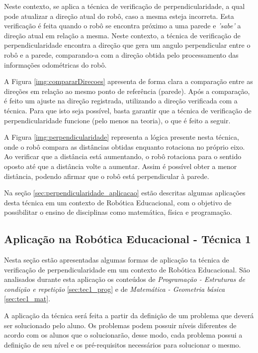 	Neste contexto, se aplica a técnica de verificação de perpendicularidade, a qual pode atualizar a direção atual do robô, caso a mesma esteja incorreta. Esta verificação é feita quando o robô se encontra próximo a uma parede e \textit{'sabe'} a direção atual em relação a mesma. Neste contexto, a técnica de verificação de perpendicularidade encontra a direção que gera um angulo perpendicular entre o robô e a parede, comparando-a com a direção obtida pelo processamento das informações odométricas do robô.

	A Figura \ref{img:compararDirecoes} apresenta de forma clara a comparação entre as direções em relação ao mesmo ponto de referência (parede). Após a comparação, é feito um ajuste na direção registrada, utilizando a direção verificada com a técnica. Para que isto seja possível, basta garantir que a técnica de verificação de perpendicularidade funcione (pelo menos na teoria), o que é feito a seguir.

	A Figura \ref{img:perpendicularidade} representa a lógica presente nesta técnica, onde o robô compara as distâncias obtidas enquanto rotaciona no próprio eixo. Ao verificar que a distância está aumentando, o robô rotaciona para o sentido oposto até que a distância volte a aumentar. Assim é possível obter a menor distância, podendo afirmar que o robô está perpendicular à parede.

	Na seção \ref{sec:perpendicularidade_aplicacao} estão descritas algumas aplicações desta técnica em um contexto de Robótica Educacional, com o objetivo de possibilitar o ensino de disciplinas como matemática, física e programação.

	\subsection{Aplicação na Robótica Educacional - Técnica 1} %
	\label{sub:aplicação_na_robótica_educacional_técnica_1}
	
		Nesta seção estão apresentadas algumas formas de aplicação ta técnica de verificação de perpendicularidade em um contexto de Robótica Educacional. São analisados durante esta aplicação os conteúdos de \textit{Programação - Estruturas de condição e repetição} \ref{sec:tec1_prog} e de \textit{Matemática - Geometria básica} \ref{sec:tec1_mat}.

		A aplicação da técnica será feita a partir da definição de um problema que deverá ser solucionado pelo aluno. Os problemas podem possuir níveis diferentes de acordo com os alunos que o solucionarão, desse modo, cada problema possui a definição de seu nível e os pré-requisitos necessários para solucionar o mesmo.

